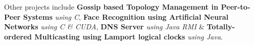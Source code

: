 \documentclass[10pt]{article}
\begin{document}




Other projects include \textbf{Gossip based Topology Management in Peer-to-Peer Systems} \textit{using C}, \textbf{Face Recognition using Artificial Neural Networks} \textit{using C \& CUDA}, 
\textbf{DNS Server} \textit{using Java RMI} \& \textbf{Totally-ordered Multicasting using Lamport logical clocks} \textit{using Java}. 
\end{document}
